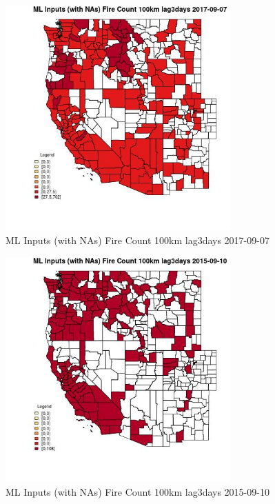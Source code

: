 \begin{figure} 
\centering  
\includegraphics[width=0.77\textwidth]{Code_Outputs/Report_ML_input_PM25_Step4_part_e_de_duplicated_aves_compiled_2019-05-21wNAs_CountyFire_Count_100km_lag3daysMean2017-09-07.jpg} 
\caption{\label{fig:Report_ML_input_PM25_Step4_part_e_de_duplicated_aves_compiled_2019-05-21wNAsCountyFire_Count_100km_lag3daysMean2017-09-07}ML Inputs (with NAs) Fire Count 100km lag3days 2017-09-07} 
\end{figure} 
 

\begin{figure} 
\centering  
\includegraphics[width=0.77\textwidth]{Code_Outputs/Report_ML_input_PM25_Step4_part_e_de_duplicated_aves_compiled_2019-05-21wNAs_CountyFire_Count_100km_lag3daysMean2015-09-10.jpg} 
\caption{\label{fig:Report_ML_input_PM25_Step4_part_e_de_duplicated_aves_compiled_2019-05-21wNAsCountyFire_Count_100km_lag3daysMean2015-09-10}ML Inputs (with NAs) Fire Count 100km lag3days 2015-09-10} 
\end{figure} 
 

